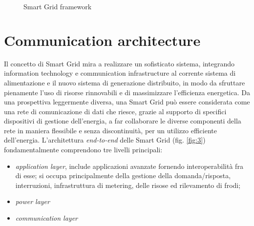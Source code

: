 \begin{figure}[h] 
\caption{Smart Grid framework}\label{fig:2}
\end{figure}

\section{Communication architecture}
Il concetto di Smart Grid mira a realizzare un sofisticato sistema, integrando information technology e communication infrastructure al corrente sistema di alimentazione e il nuovo sistema di generazione distribuito, in modo da sfruttare pienamente l'uso di risorse rinnovabili e di massimizzare l'efficienza energetica. Da una prospettiva leggermente diversa, una Smart Grid può essere considerata come una rete di comunicazione di dati che riesce, grazie al supporto di specifici dispositivi di gestione dell'energia, a far collaborare le diverse componenti della rete in maniera flessibile e senza discontinuità, per un utilizzo efficiente dell'energia.
\newline
L'architettura \emph{end-to-end} delle Smart Grid (fig. \ref{fig:3}) fondamentalmente comprendono tre livelli principali:
\begin{itemize}
	\item \emph{application layer}, include applicazioni avanzate fornendo interoperabilità fra di esse; si occupa principalmente della gestione della domanda/risposta, interruzioni, infrastruttura di metering, delle risose ed rilevamento di frodi;
	\item \emph{power layer} 
	\item \emph{communication layer}
\end{itemize}     

